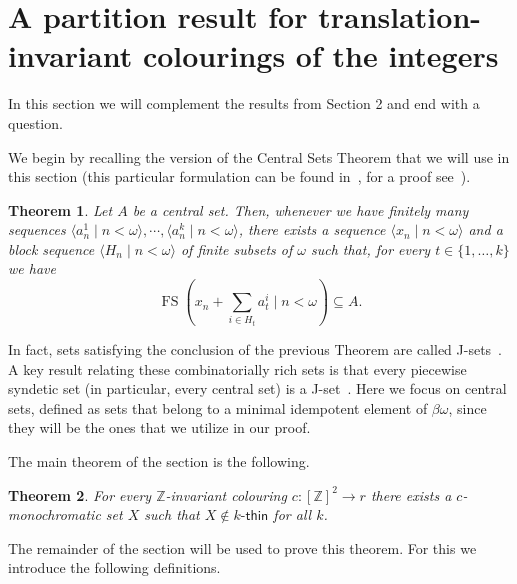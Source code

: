 \documentclass{amsart}
\newtheorem{theorem}{Theorem}[section]
\theoremstyle{definition}
\theoremstyle{remark}
\numberwithin{equation}{section}
\newcommand{\fs}{\mathop{\mathrm{FS}}}
\begin{document}
\section{A partition result for translation-invariant colourings of the integers}

In this section we will complement the results from Section 2 and end with a question.

We begin by recalling the version of the Central Sets Theorem that we will use in this section (this particular formulation can be found in~\cite{hindman-de-strauss}, for a proof see~\cite[Prop. 8.21]{furstenberg}).

\begin{theorem}\label{thm:centralsets}
    Let $A$ be a central set. Then, whenever we have finitely many sequences $\langle a_n^1\mid n<\omega\rangle,\cdots,\langle a_n^k\mid n<\omega\rangle$, there exists a sequence $\langle x_n\mid n<\omega\rangle$ and a block sequence $\langle H_n\mid n<\omega\rangle$ of finite subsets of $\omega$ such that, for every $t\in\{1,\ldots,k\}$ we have
    \begin{equation*}
        \fs\left(x_n+\sum_{i\in H_t}a_t^i\mid n<\omega\right)\subseteq A.
    \end{equation*}
\end{theorem}

In fact, sets satisfying the conclusion of the previous Theorem are called J-sets~\cite[Def.14.8.1]{hindman-strauss}. A key result relating these combinatorially rich sets is that every piecewise syndetic set (in particular, every central set) is a J-set~\cite[Theorem 14.8.3]{hindman-strauss}. Here we focus on central sets, defined as sets that belong to a minimal idempotent element of $\beta\omega$, since they will be the ones that we utilize in our proof.

The main theorem of the section is the following.

\begin{theorem}\label{thm:positivemonochromatic}
    For every $\mathbb Z$-invariant colouring $c:[\mathbb Z]^2\longrightarrow r$ there exists a $c$-monochromatic set $X$ such that $X\notin\text{$k$-$\mathsf{thin}$}$ for all $k$.
\end{theorem}

The remainder of the section will be used to prove this theorem. For this we introduce the following definitions.
\end{document}
